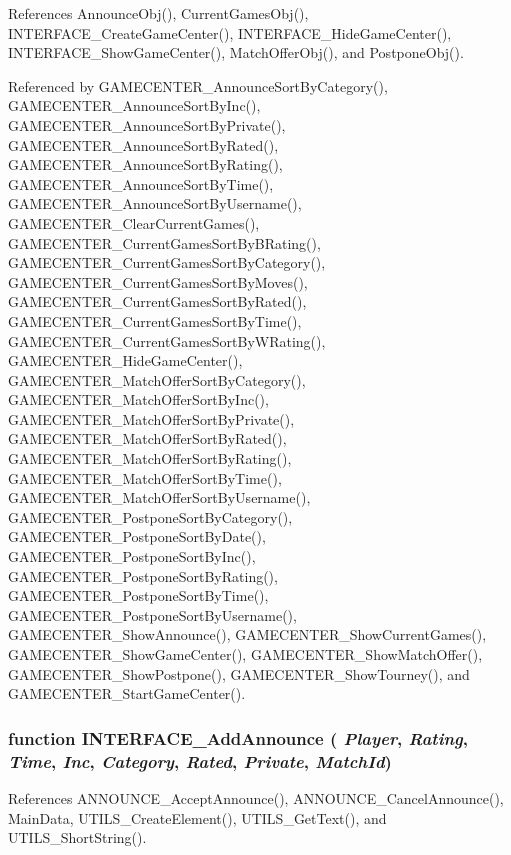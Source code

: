 References AnnounceObj(), CurrentGamesObj(), INTERFACE\_\-CreateGameCenter(), INTERFACE\_\-HideGameCenter(), INTERFACE\_\-ShowGameCenter(), MatchOfferObj(), and PostponeObj().

Referenced by GAMECENTER\_\-AnnounceSortByCategory(), GAMECENTER\_\-AnnounceSortByInc(), GAMECENTER\_\-AnnounceSortByPrivate(), GAMECENTER\_\-AnnounceSortByRated(), GAMECENTER\_\-AnnounceSortByRating(), GAMECENTER\_\-AnnounceSortByTime(), GAMECENTER\_\-AnnounceSortByUsername(), GAMECENTER\_\-ClearCurrentGames(), GAMECENTER\_\-CurrentGamesSortByBRating(), GAMECENTER\_\-CurrentGamesSortByCategory(), GAMECENTER\_\-CurrentGamesSortByMoves(), GAMECENTER\_\-CurrentGamesSortByRated(), GAMECENTER\_\-CurrentGamesSortByTime(), GAMECENTER\_\-CurrentGamesSortByWRating(), GAMECENTER\_\-HideGameCenter(), GAMECENTER\_\-MatchOfferSortByCategory(), GAMECENTER\_\-MatchOfferSortByInc(), GAMECENTER\_\-MatchOfferSortByPrivate(), GAMECENTER\_\-MatchOfferSortByRated(), GAMECENTER\_\-MatchOfferSortByRating(), GAMECENTER\_\-MatchOfferSortByTime(), GAMECENTER\_\-MatchOfferSortByUsername(), GAMECENTER\_\-PostponeSortByCategory(), GAMECENTER\_\-PostponeSortByDate(), GAMECENTER\_\-PostponeSortByInc(), GAMECENTER\_\-PostponeSortByRating(), GAMECENTER\_\-PostponeSortByTime(), GAMECENTER\_\-PostponeSortByUsername(), GAMECENTER\_\-ShowAnnounce(), GAMECENTER\_\-ShowCurrentGames(), GAMECENTER\_\-ShowGameCenter(), GAMECENTER\_\-ShowMatchOffer(), GAMECENTER\_\-ShowPostpone(), GAMECENTER\_\-ShowTourney(), and GAMECENTER\_\-StartGameCenter().
\subsubsection[INTERFACE\_\-AddAnnounce]{\setlength{\rightskip}{0pt plus 5cm}function INTERFACE\_\-AddAnnounce ( {\em Player}, \/   {\em Rating}, \/   {\em Time}, \/   {\em Inc}, \/   {\em Category}, \/   {\em Rated}, \/   {\em Private}, \/   {\em MatchId})}\label{interface_2gamecenter_8js_c9bb871b0d81e4172e41c31ce276dac9}




References ANNOUNCE\_\-AcceptAnnounce(), ANNOUNCE\_\-CancelAnnounce(), MainData, UTILS\_\-CreateElement(), UTILS\_\-GetText(), and UTILS\_\-ShortString().
